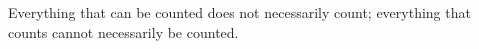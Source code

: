 
\begin{savequote}[55mm]                                              
\sffamily Everything that can be counted does not necessarily count; everything that counts cannot necessarily be counted.                          
\end{savequote}  

